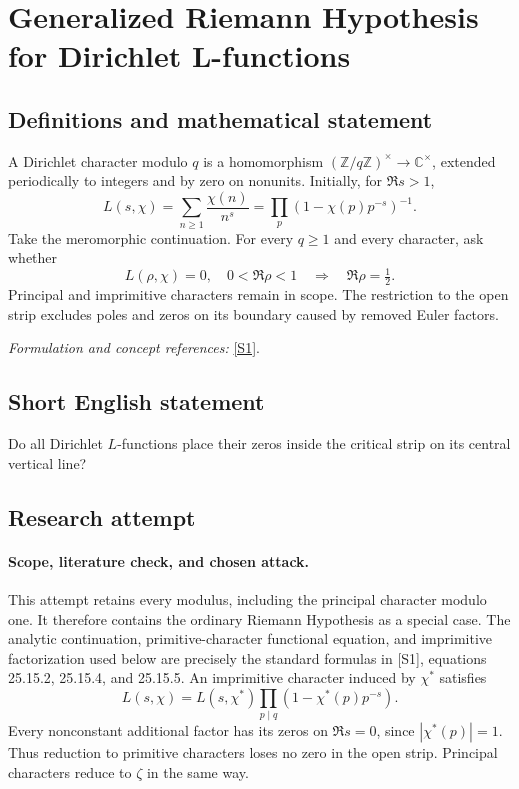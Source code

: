 \documentclass[11pt]{article}
\begin{document}
\section*{\texorpdfstring{Generalized Riemann Hypothesis for Dirichlet L-functions}{Generalized Riemann Hypothesis for Dirichlet L-functions}}\label{30006676}
\subsection{Definitions and mathematical statement}
A Dirichlet character modulo $q$ is a homomorphism $({\mathbb{Z}}/q{\mathbb{Z}})^\times\to{\mathbb{C}}^\times$, extended periodically to integers and by zero on nonunits. Initially, for $\Re s>1$,
\[
 L(s,\chi)=\sum_{n\ge1}\frac{\chi(n)}{n^s}=\prod_p(1-\chi(p)p^{-s})^{-1}.
\]
Take the meromorphic continuation. For every $q\ge1$ and every character, ask whether
\[
 L(\rho,\chi)=0,\quad0<\Re\rho<1\quad\Longrightarrow\quad\Re\rho=\tfrac12.
\]
Principal and imprimitive characters remain in scope. The restriction to the open strip excludes poles and zeros on its boundary caused by removed Euler factors.
\par\smallskip\textit{Formulation and concept references:} \href{https://dlmf.nist.gov/25.15}{[S1]}.

\subsection{Short English statement}
Do all Dirichlet $L$-functions place their zeros inside the critical strip on its central vertical line?
\subsection{Research attempt}

\paragraph{Scope, literature check, and chosen attack.}
This attempt retains every modulus, including the principal character modulo
one. It therefore contains the ordinary Riemann Hypothesis as a special case.
The analytic continuation, primitive-character functional equation, and
imprimitive factorization used below are precisely the standard formulas
in [S1], equations 25.15.2, 25.15.4, and 25.15.5. An imprimitive character
induced by $\chi^*$ satisfies
\[
 L(s,\chi)=L(s,\chi^*)\prod_{p\mid q}(1-\chi^*(p)p^{-s}).
\]
Every nonconstant additional factor has its zeros on $\Re s=0$, since
$|\chi^*(p)|=1$. Thus reduction to primitive characters loses no zero in the
open strip. Principal characters reduce to $\zeta$ in the same way.
\end{document}
